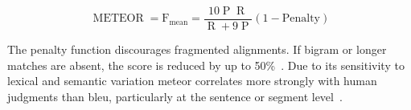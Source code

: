 \begin{equation}
    \operatorname{METEOR} = \operatorname{F_{mean}} = \frac{10  \operatorname{P}  \operatorname{R}}{\operatorname{R} + 9  \operatorname{P}}  (1 - \mathrm{Penalty})
\label{eq:meteor}
\end{equation}

The penalty function discourages fragmented alignments.
If bigram or longer matches are absent, the score is reduced by up to 50\%~\citep{banerjee_METEOR_2005}. 
Due to its sensitivity to lexical and semantic variation \ac{meteor} correlates more strongly with human judgments than \ac{bleu}, particularly at the sentence or segment level~\citep{zhou_paraphrase_2021,kurt_pehlivanoglu_comparative_2024}.









